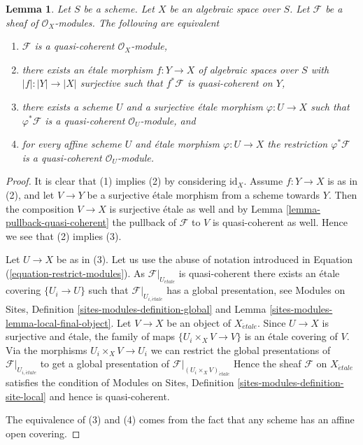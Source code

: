 \documentclass[10pt,a4paper]{amsart}
\theoremstyle{plain}
\newtheorem{lemma}[subsection]{Lemma}
\theoremstyle{definition}
\theoremstyle{remark}
\numberwithin{equation}{subsection}
\def\etale{{\acute{e}tale}}
\begin{document}
\begin{lemma}
\label{lemma-characterize-quasi-coherent}
Let $S$ be a scheme. Let $X$ be an algebraic space over $S$.
Let $\mathcal{F}$ be a sheaf of $\mathcal{O}_X$-modules.
The following are equivalent
\begin{enumerate}
\item $\mathcal{F}$ is a quasi-coherent $\mathcal{O}_X$-module,
\item there exists an \'etale morphism $f : Y \to X$ of
algebraic spaces over $S$ with $|f| : |Y| \to |X|$ surjective
such that $f^*\mathcal{F}$ is quasi-coherent on $Y$,
\item there exists a scheme $U$ and a surjective \'etale morphism
$\varphi : U \to X$ such that $\varphi^*\mathcal{F}$ is a quasi-coherent
$\mathcal{O}_U$-module, and
\item for every affine scheme $U$ and \'etale morphism $\varphi : U \to X$ the
restriction $\varphi^*\mathcal{F}$ is a quasi-coherent $\mathcal{O}_U$-module.
\end{enumerate}
\end{lemma}

\begin{proof}
It is clear that (1) implies (2) by considering $\text{id}_X$.
Assume $f : Y \to X$ is as in (2), and let $V \to Y$ be a surjective
\'etale morphism from a scheme towards $Y$. Then the composition $V \to X$ is
surjective \'etale as well
and by Lemma \ref{lemma-pullback-quasi-coherent} the pullback of $\mathcal{F}$
to $V$ is quasi-coherent as well. Hence we see that (2) implies (3).

\medskip\noindent
Let $U \to X$ be as in (3). Let us use the abuse of notation introduced
in Equation (\ref{equation-restrict-modules}).
As $\mathcal{F}|_{U_\etale}$ is quasi-coherent there exists an
\'etale covering $\{U_i \to U\}$ such that
$\mathcal{F}|_{U_{i, \etale}}$ has a global presentation, see
Modules on Sites, Definition \ref{sites-modules-definition-global} and
Lemma \ref{sites-modules-lemma-local-final-object}.
Let $V \to X$ be an object of $X_\etale$. Since $U \to X$ is
surjective and \'etale, the family of maps $\{U_i \times_X V \to V\}$ is an
\'etale covering
of $V$. Via the morphisms $U_i \times_X V \to U_i$ we can restrict the
global presentations of $\mathcal{F}|_{U_{i, \etale}}$ to get a global
presentation of $\mathcal{F}|_{(U_i \times_X V)_\etale}$
Hence the sheaf $\mathcal{F}$ on $X_\etale$ satisfies the condition of
Modules on Sites, Definition \ref{sites-modules-definition-site-local}
and hence is quasi-coherent.

\medskip\noindent
The equivalence of (3) and (4) comes from the fact that any scheme has
an affine open covering.
\end{proof}
\end{document}
